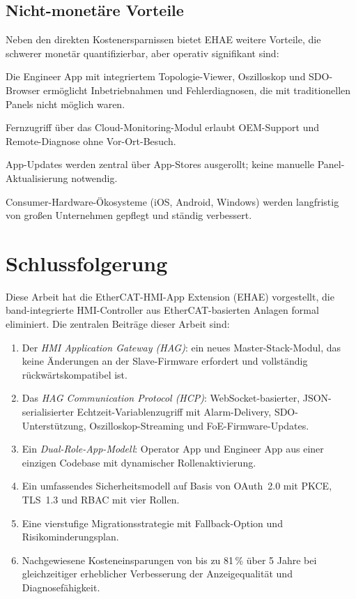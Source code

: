 ﻿\documentclass[12pt,a4paper]{article}
\begin{document}
\subsection{Nicht-monetäre Vorteile}

Neben den direkten Kostenersparnissen bietet EHAE weitere Vorteile, die schwerer
monetär quantifizierbar, aber operativ signifikant sind:

\begin{description}[leftmargin=2em]
  \item[Verbesserte Diagnosefähigkeit] Die Engineer App mit integriertem Topologie-Viewer,
    Oszilloskop und SDO-Browser ermöglicht Inbetriebnahmen und Fehlerdiagnosen, die mit
    traditionellen Panels nicht möglich waren.
  \item[Ortsunabhängiges Monitoring] Fernzugriff über das Cloud-Monitoring-Modul erlaubt
    OEM-Support und Remote-Diagnose ohne Vor-Ort-Besuch.
  \item[Kürzere Update-Zyklen] App-Updates werden zentral über App-Stores ausgerollt;
    keine manuelle Panel-Aktualisierung notwendig.
  \item[Zukunftssicherheit] Consumer-Hardware-Ökosysteme (iOS, Android, Windows)
    werden langfristig von gro\ss{}en Unternehmen gepflegt und ständig verbessert.
\end{description}

\section{Schlussfolgerung}
\label{sec:conclusion}

Diese Arbeit hat die EtherCAT-HMI-App Extension (EHAE) vorgestellt, die
band-integrierte HMI-Controller aus EtherCAT-basierten Anlagen formal eliminiert. Die
zentralen Beiträge dieser Arbeit sind:

\begin{enumerate}[leftmargin=2em]
  \item Der \emph{HMI Application Gateway (HAG)}: ein neues Master-Stack-Modul, das
    keine Änderungen an der Slave-Firmware erfordert und vollständig rückwärtskompatibel
    ist.
  \item Das \emph{HAG Communication Protocol (HCP)}: WebSocket-basierter,
    JSON-serialisierter Echtzeit-Variablenzugriff mit Alarm-Delivery, SDO-Unterstützung,
    Oszilloskop-Strea\-ming und FoE-Firmware-Updates.
  \item Ein \emph{Dual-Role-App-Modell}: Operator App und Engineer App aus einer einzigen
    Codebase mit dynamischer Rollenaktivierung.
  \item Ein umfassendes Sicherheitsmodell auf Basis von OAuth~2.0 mit PKCE, TLS~1.3 und
    RBAC mit vier Rollen.
  \item Eine vierstufige Migrationsstrategie mit Fallback-Option und Risikominderungsplan.
  \item Nachgewiesene Kosteneinsparungen von bis zu 81\,\% über 5 Jahre bei gleichzeitiger
    erheblicher Verbesserung der Anzeigequalität und Diagnosefähigkeit.
\end{enumerate}
\end{document}
